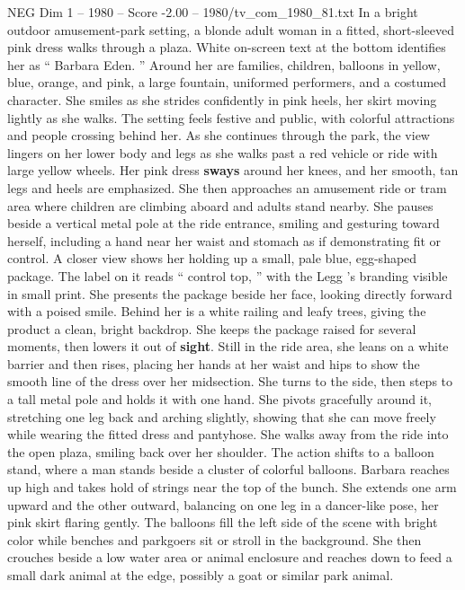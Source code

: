 \begin{textsample}{NEG Dim 1 – 1980 – Score -2.00 – 1980/tv\_com\_1980\_81.txt}  \label{ex:f1_neg_043}
In a bright outdoor amusement-park setting, a blonde adult woman in a fitted, short-sleeved pink dress walks through a plaza.
White on-screen text at the bottom identifies her as “ Barbara Eden. ” Around her are families, children, balloons in yellow, blue, orange, and pink, a large fountain, uniformed performers, and a costumed character.
She smiles as she strides confidently in pink heels, her skirt moving lightly as she walks.
The setting feels festive and public, with colorful attractions and people crossing behind her.
As she continues through the park, the view lingers on her lower body and legs as she walks past a red vehicle or ride with large yellow wheels.
Her pink dress \textbf{sways} around her knees, and her smooth, tan legs and heels are emphasized.
She then approaches an amusement ride or tram area where children are climbing aboard and adults stand nearby.
She pauses beside a vertical metal pole at the ride entrance, smiling and gesturing toward herself, including a hand near her waist and stomach as if demonstrating fit or control.
A closer view shows her holding up a small, pale blue, egg-shaped package.
The label on it reads “ control top, ” with the Legg ’s branding visible in small print.
She presents the package beside her face, looking directly forward with a poised smile.
Behind her is a white railing and leafy trees, giving the product a clean, bright backdrop.
She keeps the package raised for several moments, then lowers it out of \textbf{sight}.
Still in the ride area, she leans on a white barrier and then rises, placing her hands at her waist and hips to show the smooth line of the dress over her midsection.
She turns to the side, then steps to a tall metal pole and holds it with one hand.
She pivots gracefully around it, stretching one leg back and arching slightly, showing that she can move freely while wearing the fitted dress and pantyhose.
She walks away from the ride into the open plaza, smiling back over her shoulder.
The action shifts to a balloon stand, where a man stands beside a cluster of colorful balloons.
Barbara reaches up high and takes hold of strings near the top of the bunch.
She extends one arm upward and the other outward, balancing on one leg in a dancer-like pose, her pink skirt flaring gently.
The balloons fill the left side of the scene with bright color while benches and parkgoers sit or stroll in the background.
She then crouches beside a low water area or animal enclosure and reaches down to feed a small dark animal at the edge, possibly a goat or similar park animal.

\end{textsample}

